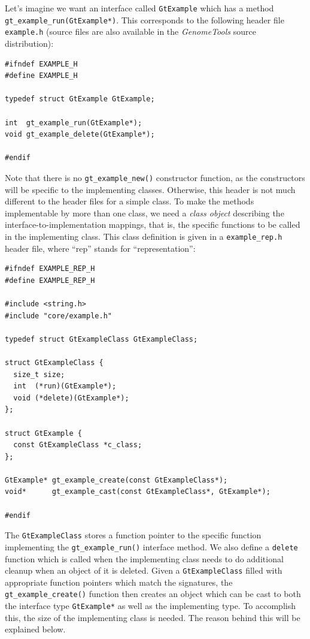 \documentclass[11pt,final]{article}
\newcommand{\keyword}[1]{\lstinline{#1}}
\newcommand{\Gt}[0]{\emph{GenomeTools}\xspace}
\begin{document}
Let's imagine we want an interface called \keyword{GtExample} which has a
method \keyword{gt_example_run(GtExample*)}. This corresponds to the following
header file \keyword{example.h} (source files are also available in the \Gt
source distribution):

\begin{lstlisting}
#ifndef EXAMPLE_H
#define EXAMPLE_H

typedef struct GtExample GtExample;

int  gt_example_run(GtExample*);
void gt_example_delete(GtExample*);

#endif
\end{lstlisting}

Note that there is no \keyword{gt_example_new()} constructor function, as the
constructors will be specific to the implementing classes.
Otherwise, this header is not much different to the header files for a simple
class. To make the methods implementable by more than one class,
we need a \emph{class object} describing the interface-to-implementation
mappings, that is, the specific functions to be called in the implementing
class. This class definition is given in a \keyword{example_rep.h} header file,
where ``rep'' stands for ``representation'':

\begin{lstlisting}
#ifndef EXAMPLE_REP_H
#define EXAMPLE_REP_H

#include <string.h>
#include "core/example.h"

typedef struct GtExampleClass GtExampleClass;

struct GtExampleClass {
  size_t size;
  int  (*run)(GtExample*);
  void (*delete)(GtExample*);
};

struct GtExample {
  const GtExampleClass *c_class;
};

GtExample* gt_example_create(const GtExampleClass*);
void*      gt_example_cast(const GtExampleClass*, GtExample*);

#endif
\end{lstlisting}

The \keyword{GtExampleClass} stores a function pointer to the specific function
implementing the \keyword{gt_example_run()} interface method. We also define a
\keyword{delete} function which is called when the implementing class needs to
do additional cleanup when an object of it is deleted. Given a
\keyword{GtExampleClass} filled with appropriate function pointers which
match the signatures, the \keyword{gt_example_create()} function then creates
an object which can be cast to both the interface type \keyword{GtExample*} as
well as the implementing type. To accomplish this, the size of the
implementing class is needed. The reason behind this will be explained below.
\end{document}
